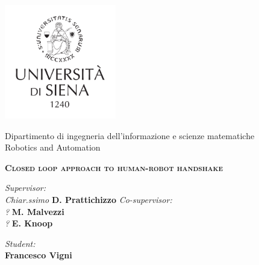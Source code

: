 \thispagestyle{empty}
\begin{center}
\includegraphics[height=5cm]{Figure/LOGO_UNISI.pdf}

\large{ \sc Dipartimento di ingegneria dell'informazione e scienze matematiche}
\vspace{0.5cm
\large Computer and Automation Engineering}\\
\vspace{0.5cm}
\large {\sc Robotics and Automation}
\vspace{1cm}
 

{\LARGE \textbf{\textsc{Closed loop approach to human-robot handshake}}}

\end{center}

\noindent\begin{minipage}[b]{0.47\textwidth}
\begin{flushleft} 
\large
\emph{Supervisor:}\\
\textit{Chiar.ssimo} \textbf{D. Prattichizzo}  
\emph{Co-supervisor:}\\
\textit{?} \textbf{M. Malvezzi}\\
\textit{?} \textbf{E. Knoop}

\end{flushleft}
\end{minipage}
\hfill
\begin{minipage}[b]{0.47\textwidth}\raggedleft
 \large
\emph{Student:}\\
\textbf{Francesco Vigni}\\


\end{minipage}

